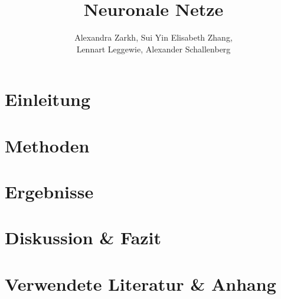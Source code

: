 \documentclass[paper=A4,pagesize=auto,12pt,headinclude=true,footinclude=true,BCOR=0mm,DIV=calc]{scrartcl}
\title{Neuronale Netze}
\author{Alexandra Zarkh, Sui Yin Elisabeth Zhang,\\ Lennart Leggewie, Alexander Schallenberg}
\begin{document}
\begin{titlepage}
	\maketitle
\end{titlepage}

\tableofcontents
\newpage

\section{Einleitung}

\section{Methoden}

\section{Ergebnisse}

\section{Diskussion \& Fazit}

\section{Verwendete Literatur \& Anhang}
\end{document}
